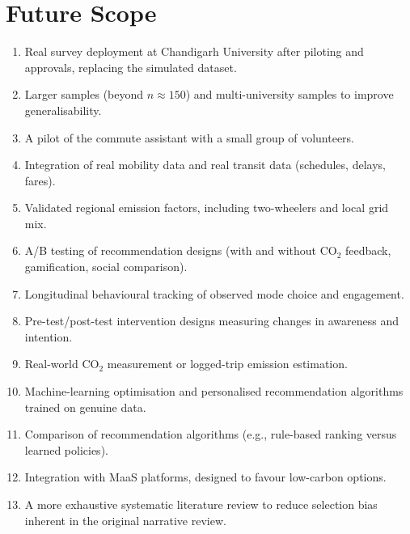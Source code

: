 \documentclass[11pt,a4paper]{article}
\begin{document}
\section{Future Scope}
\begin{enumerate}[leftmargin=*]
\item Real survey deployment at Chandigarh University after piloting and approvals, replacing the
simulated dataset.
\item Larger samples (beyond $n \approx 150$) and multi-university samples to improve
generalisability.
\item A pilot of the commute assistant with a small group of volunteers.
\item Integration of real mobility data and real transit data (schedules, delays, fares).
\item Validated regional emission factors, including two-wheelers and local grid mix.
\item A/B testing of recommendation designs (with and without CO$_2$ feedback, gamification, social
comparison).
\item Longitudinal behavioural tracking of observed mode choice and engagement.
\item Pre-test/post-test intervention designs measuring changes in awareness and intention.
\item Real-world CO$_2$ measurement or logged-trip emission estimation.
\item Machine-learning optimisation and personalised recommendation algorithms trained on genuine
data.
\item Comparison of recommendation algorithms (e.g., rule-based ranking versus learned policies).
\item Integration with MaaS platforms, designed to favour low-carbon options.
\item A more exhaustive systematic literature review to reduce selection bias inherent in the
original narrative review.
\end{enumerate}
\end{document}

